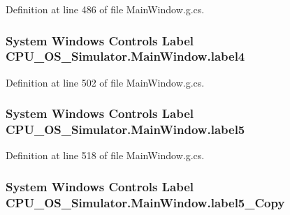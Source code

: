 Definition at line 486 of file Main\+Window.\+g.\+cs.

\hypertarget{class_c_p_u___o_s___simulator_1_1_main_window_a3473dc873d8c8d8f4bba6e83f5684299}{}
\subsubsection[{label4}]{\setlength{\rightskip}{0pt plus 5cm}System Windows Controls Label C\+P\+U\+\_\+\+O\+S\+\_\+\+Simulator.\+Main\+Window.\+label4\hspace{0.3cm}{\ttfamily [package]}}\label{class_c_p_u___o_s___simulator_1_1_main_window_a3473dc873d8c8d8f4bba6e83f5684299}


Definition at line 502 of file Main\+Window.\+g.\+cs.

\hypertarget{class_c_p_u___o_s___simulator_1_1_main_window_a37b18e7542e985a8984375d0b1cf441e}{}
\subsubsection[{label5}]{\setlength{\rightskip}{0pt plus 5cm}System Windows Controls Label C\+P\+U\+\_\+\+O\+S\+\_\+\+Simulator.\+Main\+Window.\+label5\hspace{0.3cm}{\ttfamily [package]}}\label{class_c_p_u___o_s___simulator_1_1_main_window_a37b18e7542e985a8984375d0b1cf441e}


Definition at line 518 of file Main\+Window.\+g.\+cs.

\hypertarget{class_c_p_u___o_s___simulator_1_1_main_window_aadfe7782d7e25b730849222805a541f9}{}
\subsubsection[{label5\+\_\+\+Copy}]{\setlength{\rightskip}{0pt plus 5cm}System Windows Controls Label C\+P\+U\+\_\+\+O\+S\+\_\+\+Simulator.\+Main\+Window.\+label5\+\_\+\+Copy\hspace{0.3cm}{\ttfamily [package]}}\label{class_c_p_u___o_s___simulator_1_1_main_window_aadfe7782d7e25b730849222805a541f9}


